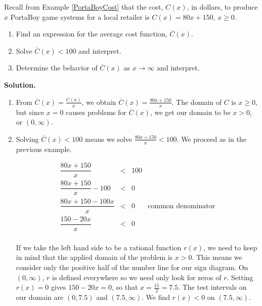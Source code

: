 \begin{ex} \label{averagecostapp} Recall from Example \ref {PortaBoyCost} that the cost,  $C(x)$, in dollars, to produce $x$ PortaBoy game systems for a local retailer is $C(x) = 80x + 150$, $x \geq 0$.

\begin{enumerate}

\item  Find an expression for the average cost function, $\overline{C}(x)$. 

\item  \label{costlessthan} Solve $\overline{C}(x) < 100$ and interpret.

\item  Determine the behavior of $\overline{C}(x)$ as $x \rightarrow \infty$ and interpret.


\end{enumerate}

{\bf Solution.}

\begin{enumerate}

\item  From $\overline{C}(x) = \frac{C(x)}{x}$, we obtain $\overline{C}(x) = \frac{80x+150}{x}$.  The domain of $C$ is $x \geq 0$, but since $x=0$ causes problems for $\overline{C}(x)$, we get our domain to be $x>0$, or $(0, \infty)$.

\item  Solving $\overline{C}(x) < 100$ means we solve $\frac{80x+150}{x} < 100$.  We proceed as in the previous example.

\[ \begin{array}{rclr}

\dfrac{80x+150}{x} & < & 100 & \\ [10pt]

\dfrac{80x+150}{x} - 100 & < & 0 & \\ [10pt]

\dfrac{80x + 150 - 100x}{x} & < & 0 & \text{common denominator} \\ [10pt]

\dfrac{150 - 20x}{x} & < & 0 & \\

\end{array} \]

If we take the left hand side to be a rational function $r(x)$, we need to keep in mind that the applied domain of the problem is $x > 0$.  This means we consider only the positive half of the number line for our sign diagram.  On $(0, \infty)$, $r$ is defined everywhere so we need only look for zeros of $r$.  Setting $r(x)=0$ gives $150-20x =0$, so that $x = \frac{15}{2}= 7.5$.  The test intervals on our domain are $(0, 7.5)$ and $(7.5, \infty)$.  We find $r(x) < 0$ on $(7.5, \infty)$.  


\end{enumerate}
\end{ex}
